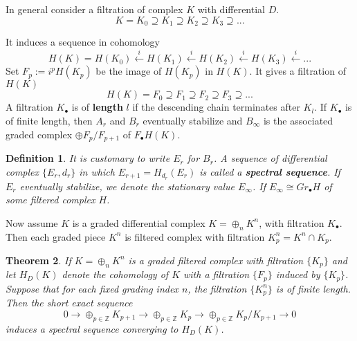 \documentclass[11pt]{article}
\newtheorem{thm}{Theorem}[section]
\newtheorem{dfn}[thm]{Definition}
\newcommand{\intg}{\mathbb Z}
\newcommand{\llta}{\longleftarrow}
\newcommand{\lrta}{\longrightarrow}
\begin{document}
In general consider a filtration of complex $K$ with differential $D$. 
$$
K=K_0\supseteq K_1\supseteq K_2\supseteq K_3\supseteq...
$$

It induces a sequence in cohomology
$$
H(K)=H(K_0)\overset{i}{\llta} H(K_1)\overset{i}{\llta} H(K_2)\overset{i}{\llta} H(K_3)\overset{i}{\llta}...
$$
Set $F_p:=i^pH(K_p)$ be the image of $H(K_p)$ in $H(K)$. It gives a filtration of $H(K)$
$$
H(K)=F_0\supseteq F_1\supseteq F_2\supseteq F_3\supseteq...
$$
A filtration $K_\bullet$ is of \textbf{length} $l$ if the descending chain terminates after $K_l$. If $K_\bullet$ is of finite length, then $A_r$ and $B_r$ eventually stabilize and $B_\infty$ is the associated graded complex $\oplus F_p/F_{p+1}$ of $F_\bullet H(K)$. 
\begin{dfn}
It is customary to write $E_r$ for $B_r$. A sequence of differential complex $\{E_r,d_r\}$ in which $E_{r+1}=H_{d_r}(E_r)$ is called a \textbf{spectral sequence}. If $E_r$ eventually stabilize, we denote the stationary value $E_\infty$. If $E_\infty\cong Gr_\bullet H$ of some filtered complex $H$. 
\end{dfn}
Now assume $K$ is a graded differential complex $K=\oplus_n K^n$, with filtration $K_\bullet$. Then each graded piece $K^n$ is filtered complex with filtration $K^{n}_p=K^n\cap K_p$.
\begin{thm}
If $K=\oplus_n K^n$ is a graded filtered complex with filtration $\{K_p\}$ and let $H_D(K)$ denote the cohomology of $K$ with a filtration $\{F_p\}$ induced by $\{K_p\}$. Suppose that for each fixed grading index $n$, the filtration $\{K^{n}_p\}$ is of finite length. Then the short exact sequence 
$$
0\lrta \oplus_{p\in\intg} K_{p+1}\lrta \oplus_{p\in\intg} K_{p}\lrta \oplus_{p\in\intg} K_{p}/K_{p+1}\lrta 0
$$
induces a spectral sequence converging to $H_D(K)$.
\end{thm}
\end{document}
